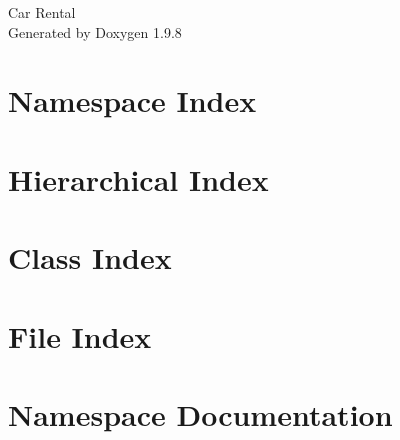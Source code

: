 \documentclass[twoside]{book}
\newcommand{\+}{\discretionary{\mbox{\scriptsize$\hookleftarrow$}}{}{}}
\newcommand{\clearemptydoublepage}{%
    \newpage{\pagestyle{empty}\cleardoublepage}%
  }
\begin{document}
  \raggedbottom
    \hypersetup{pageanchor=false,
                bookmarksnumbered=true,
                pdfencoding=unicode
               }
  \begin{titlepage}
  \vspace*{7cm}
  \begin{center}%
  {\Large Car Rental}\\
  \vspace*{1cm}
  {\large Generated by Doxygen 1.9.8}\\
  \end{center}
  \end{titlepage}
  \clearemptydoublepage
  \tableofcontents
  \clearemptydoublepage
  \hypersetup{pageanchor=true}

\chapter{Namespace Index}

\chapter{Hierarchical Index}

\chapter{Class Index}

\chapter{File Index}

\chapter{Namespace Documentation}









\end{document}
